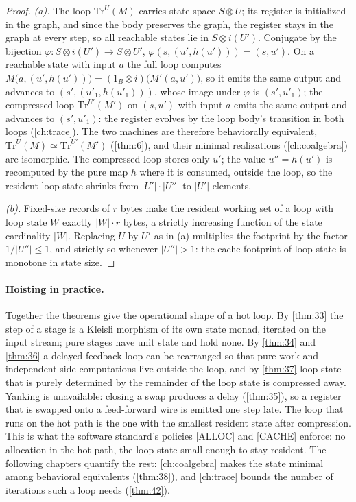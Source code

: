 \begin{proof}
\emph{(a).} The loop $\mathrm{Tr}^{U} (M)$ carries state space $S \otimes
U$; its register is initialized in the graph, and since the body preserves
the graph, the register stays in the graph at every step, so all reachable
states lie in $S \otimes i (U')$. Conjugate by the bijection $\varphi :
S \otimes i (U') \to S \otimes U'$, $\varphi (s, (u', h (u'))) = (s, u')$.
On a reachable state with input $a$ the full loop computes
$M\bigl (a, (u', h (u'))\bigr) = (1_B \otimes i)\bigl (M'(a, u')\bigr)$, so it
emits the same output and advances to $(s', (u'_{1}, h (u'_{1})))$, whose
image under $\varphi$ is $(s', u'_{1})$; the compressed loop
$\mathrm{Tr}^{U'} (M')$ on $(s, u')$ with input $a$ emits the same output
and advances to $(s', u'_{1})$: the register evolves by the loop body's
transition in both loops (\autoref{ch:trace}). The two machines are
therefore behaviorally equivalent, $\mathrm{Tr}^{U} (M) \simeq
\mathrm{Tr}^{U'} (M')$ (\autoref{thm:6}), and their minimal realizations
(\autoref{ch:coalgebra}) are isomorphic. The compressed loop stores only
$u'$; the value $u'' = h (u')$ is recomputed by the pure map $h$ where it
is consumed, outside the loop, so the resident loop state shrinks from
$|U'| \cdot |U''|$ to $|U'|$ elements.

\emph{(b).} Fixed-size records of $r$ bytes make the resident working set
of a loop with loop state $W$ exactly $|W| \cdot r$ bytes, a strictly
increasing function of the state cardinality $|W|$. Replacing $U$ by $U'$
as in (a) multiplies the footprint by the factor $1/|U''| \leq 1$, and
strictly so whenever $|U''| > 1$: the cache footprint of loop state is
monotone in state size.
\end{proof}

\paragraph{Hoisting in practice.}
Together the theorems give the operational shape of a hot loop. By
\autoref{thm:33} the step of a stage is a Kleisli morphism of its own
state monad, iterated on the input stream; pure stages have unit state
and hold none. By \autoref{thm:34} and \autoref{thm:36} a delayed
feedback loop can be rearranged so that pure work and independent side
computations live outside the loop, and by \autoref{thm:37} loop state
that is purely determined by the remainder of the loop state is
compressed away. Yanking is unavailable: closing a swap produces a
delay (\autoref{thm:35}), so a register that is swapped onto a
feed-forward wire is emitted one step late. The loop that runs on the
hot path is the one with the smallest resident state after compression.
This is what the software standard's policies [ALLOC] and [CACHE]
enforce: no allocation in the hot path, the loop state small enough to
stay resident. The following chapters quantify the rest:
\autoref{ch:coalgebra} makes the state minimal among behavioral
equivalents (\autoref{thm:38}), and \autoref{ch:trace} bounds the
number of iterations such a loop needs (\autoref{thm:42}).
